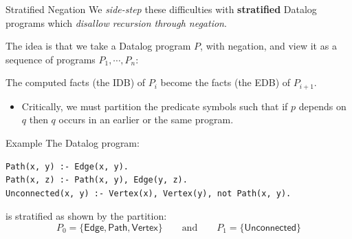 \begin{frame}{Stratified Negation}
We \emph{side-step} these difficulties with \textbf{stratified} Datalog programs
which \emph{disallow recursion through negation}.

The idea is that we take a Datalog program $P$, with negation, and view it as a
sequence of programs $P_1, \cdots, P_n$: 

\medskip

\begin{center}
\end{center}

The computed facts (the IDB) of $P_i$ become the facts (the EDB) of $P_{i + 1}$.
\begin{itemize}
    \item Critically, we must partition the predicate symbols such that if $p$
    depends on $q$ then $q$ occurs in an earlier or the same program. 
\end{itemize}
\end{frame}

\begin{frame}[fragile]{Example}
The Datalog program: 

\begin{lstlisting}[language=flix, xleftmargin=0.8cm]
Path(x, y) :- Edge(x, y).
Path(x, z) :- Path(x, y), Edge(y, z).
Unconnected(x, y) :- Vertex(x), Vertex(y), not Path(x, y).
\end{lstlisting}

is stratified as shown by the partition:
%
$$
P_0 = \{ \textsf{Edge}, \textsf{Path}, \textsf{Vertex} \} 
\qquad \text{and} \qquad
P_1 = \{ \textsf{Unconnected} \} 
$$
\end{frame}

